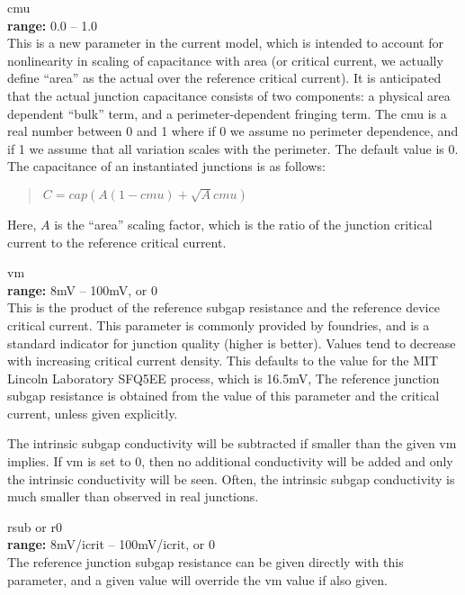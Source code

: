 \begin{description}
\item{\vt cmu}\\
{\bf range:} 0.0 -- 1.0\\
This is a new parameter in the current model, which is intended to
account for nonlinearity in scaling of capacitance with area (or
critical current, we actually define ``area'' as the actual over the
reference critical current).  It is anticipated that the actual
junction capacitance consists of two components:  a physical area
dependent ``bulk'' term, and a perimeter-dependent fringing term.  The
{\vt cmu} is a real number between 0 and 1 where if 0 we assume no
perimeter dependence, and if 1 we assume that all variation scales
with the perimeter.  The default value is 0.  The capacitance of an
instantiated junctions is as follows:
\begin{quote}
$C = cap (A(1-cmu) + \sqrt{A} cmu)$
\end{quote}
Here, $A$ is the ``area'' scaling factor, which is the ratio of the
junction critical current to the reference critical current.

\item{\vt vm}\\
{\bf range:} 8mV -- 100mV, or 0\\
This is the product of the reference subgap resistance and the
reference device critical current.  This parameter is commonly
provided by foundries, and is a standard indicator for junction
quality (higher is better).  Values tend to decrease with increasing
critical current density.  This defaults to the value for the MIT
Lincoln Laboratory SFQ5EE process\cite{tolpygo}, which is 16.5mV, The
reference junction subgap resistance is obtained from the value of
this parameter and the critical current, unless given explicitly.

The intrinsic subgap conductivity will be subtracted if smaller than
the given {\vt vm} implies.  If {\vt vm} is set to 0, then no
additional conductivity will be added and only the intrinsic
conductivity will be seen.  Often, the intrinsic subgap conductivity
is much smaller than observed in real junctions.

\item{{\vt rsub} or {\vt r0}}\\
{\bf range:} 8mV/{\vt icrit} -- 100mV/{\vt icrit}, or 0\\
The reference junction subgap resistance can be given directly
with this parameter, and a given value will override the
{\vt vm} value if also given.


\end{description}
